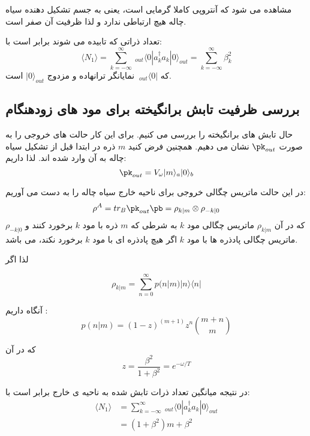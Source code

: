  مشاهده می شود که آنتروپی کاملا گرمایی است، یعنی به جسم تشکیل دهنده سیاه چاله هیچ ارتباطی ندارد و لذا ظرفیت آن صفر است.
 
 تعداد ذراتی که تابیده می شوند برابر است با:
 \begin{equation}
 	\langle N_1 \rangle = \sum_{k=-\infty}^{\infty} \ _{out} \langle 0 |a_k^\dagger a_k |0\rangle _{out} = \sum_{k=-\infty}^{\infty} \beta_k^2
 \end{equation}
 که 
 $\ _{out} \langle 0|$
 نمایانگر ترانهاده و مزدوج 
 $|0\rangle_{out}$
 است.
\subsection{بررسی ظرفیت تابش برانگیخته برای مود های زودهنگام}
حال تابش های برانگیخته را بررسی می کنیم. برای این کار حالت های خروجی را به صورت
$\pk_{out}$
نشان می دهیم. همچنین فرض کنید 
$m$
ذره در ابتدا قبل از تشکیل سیاه چاله به آن وارد شده اند. لذا داریم:
\begin{equation}
	\pk_{out} = V_\omega |m\rangle_a |0\rangle_b
\end{equation}

در این حالت ماتریس چگالی خروجی برای ناحیه خارج سیاه چاله را به دست می آوریم:
\begin{equation}
	\rho^A = tr_B \pk_{out} \pb = \rho_{k|m} \otimes \rho_{-k|0}
\end{equation}
که در آن
$\rho_{k|m}$
ماتریس چگالی مود 
$k$
به شرطی که 
$m$
ذره با مود
$k$
برخورد کنند و 
$\rho_{-k|0}$
ماتریس چگالی پادذره ها با مود 
$k$
اگر هیچ پادذره ای با مود
$k$
برخورد نکند، می باشد.

لذا اگر

\begin{equation}
	\rho_{k|m} = \sum_{n=0}^{\infty} p(n|m) |n\rangle \langle n|
\end{equation}

آنگاه داریم
\cite{cit}
:
\begin{equation} \label{csharti}
	p(n|m) = (1-z) ^{(m+1)} z^n \binom{m+n}{m}
\end{equation}

که در آن
\begin{equation}
	z = \frac{\beta^2}{1+\beta^2} = e^{-\omega/T}
\end{equation}

در نتیجه میانگین تعداد ذرات تابش شده به ناحیه ی خارج برابر است با:
\begin{align}
	\langle N_1 \rangle &= \sum_{k=-\infty}^{\infty} \ _{out} \langle 0 |a_k^\dagger a_k |0\rangle _{out} \\
	&= (1+\beta^2)m + \beta^2
\end{align}

